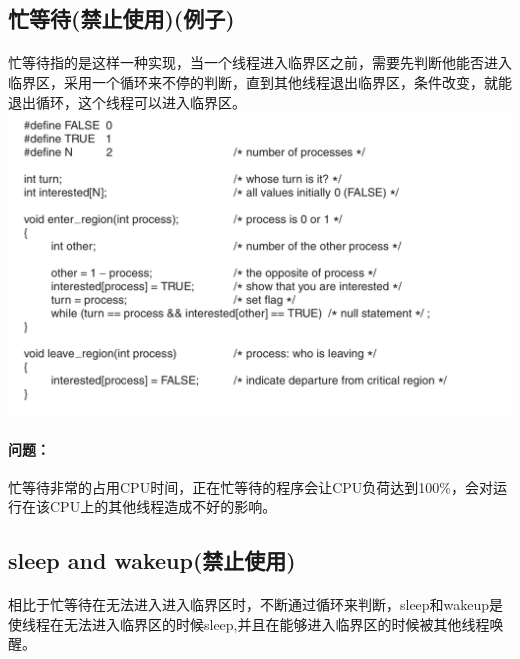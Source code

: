 \documentclass[12pt]{article}
\begin{document}
\begin{CJK}{UTF8}{gbsn}
\subsection{忙等待(禁止使用)(例子)}
\paragraph{}忙等待指的是这样一种实现，当一个线程进入临界区之前，需要先判断他能否进入临界区，采用一个循环来不停的判断，直到其他线程退出临界区，条件改变，就能退出循环，这个线程可以进入临界区。
\includegraphics[width=6in]{wait.png}
\paragraph{问题：}忙等待非常的占用CPU时间，正在忙等待的程序会让CPU负荷达到100\%，会对运行在该CPU上的其他线程造成不好的影响。
\subsection{sleep and wakeup(禁止使用)}
\paragraph{}相比于忙等待在无法进入进入临界区时，不断通过循环来判断，sleep和wakeup是使线程在无法进入临界区的时候sleep,并且在能够进入临界区的时候被其他线程唤醒。

\end{CJK}
\end{document}
